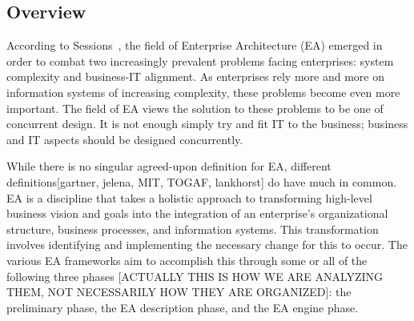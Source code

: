 




\subsection{Overview}
According to Sessions~\cite{sessions2007}, the field of Enterprise Architecture (EA) emerged in order to combat two increasingly prevalent problems facing enterprises: system complexity and business-IT alignment. As enterprises rely more and more on information systems of increasing complexity, these problems become even more important. The field of EA views the solution to these problems to be one of concurrent design. It is not enough simply try and fit IT to the business; business and IT aspects should be designed concurrently. 

While there is no singular agreed-upon definition for EA, different definitions[gartner, jelena, MIT, TOGAF, lankhorst] do have much in common. EA is a discipline that takes a holistic approach to transforming high-level business vision and goals into the integration of an enterprise's organizational structure, business processes, and information systems. This transformation involves identifying and implementing the necessary change for this to occur. The various EA frameworks aim to accomplish this through some or all of the following three phases [ACTUALLY THIS IS HOW WE ARE ANALYZING THEM, NOT NECESSARILY HOW THEY ARE ORGANIZED]: the preliminary phase, the EA description phase, and the EA engine phase. 

